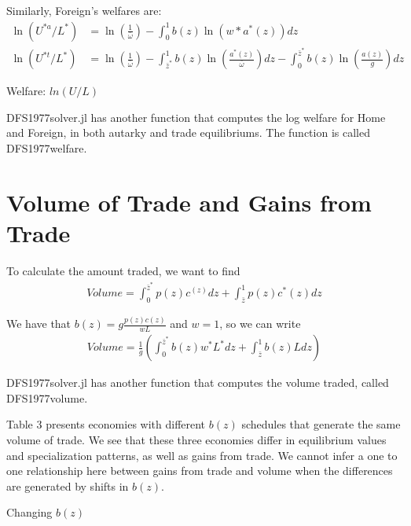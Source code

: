\documentclass[11pt]{article}
\begin{document}
Similarly, Foreign's welfares are:
\begin{align*}
    \ln (U^{* a} / L^*) &=\ln \left(\frac{1}{\bar{\omega}}\right)-\int_{0}^{1} b(z) \ln (w* a^*(z)) dz \\
    \ln (U^{* t} / L^*) &= \ln \left(\frac{1}{\bar{\omega}}\right) -\int_{\bar{z}^*}^{1} b(z) \ln \left(\frac{a^*(z)}{\bar{\omega}}\right) d z-\int_{0}^{\bar{z}^*} b(z) \ln \left(\frac{a(z) }{g}\right) d z
\end{align*}

\begin{table}[H]
    \centering
    \caption{Welfare: $ln(U/L)$}
    
\end{table}

DFS1977solver.jl has another function that computes the log welfare for Home and Foreign, in both autarky and trade equilibriums. The function is called DFS1977welfare. 

\section{Volume of Trade and Gains from Trade}
To calculate the amount traded, we want to find 
\begin{align*}
    Volume = \int_{0}^{\bar{z}^{*}} p(z) c^(z) d z + \int_{\bar{z}}^{1} p(z) c^*(z) d z
\end{align*}

We have that $b(z) = g\frac{p(z)c(z)}{wL}$ and $w = 1$, so we can write 
\begin{align*}
    Volume = \frac{1}{g}\left(\int_{0}^{\bar{z}^{*}} b(z) w^* L^{*} d z+\int_{\bar{z}}^{1} b(z) L d z\right)
\end{align*}

DFS1977solver.jl has another function that computes the volume traded, called DFS1977volume. 

Table 3 presents economies with different $b(z)$ schedules that generate the same volume of trade. We see that these three economies differ in equilibrium values and specialization patterns, as well as gains from trade. We cannot infer a one to one relationship here between gains from trade and volume when the differences are generated by shifts in $b(z)$. 

\begin{table}[H]
    \centering
    \caption{Changing $b(z)$}
    
\end{table}
\end{document}
